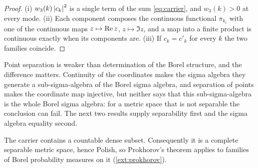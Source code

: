 \begin{proof}
(i) $w_3(k)\left| c_k \right|^2$ is a single term of the sum \eqref{eq:carrier}, and
$w_3(k)>0$ at every mode. (ii) Each component composes the continuous
functional $\pi_{k_i}$ with one of the continuous maps $z\mapsto\operatorname{Re} z$,
$z\mapsto\Im z$, and a map into a finite product is continuous exactly when its
components are. (iii) If $c_k=c'_k$ for every $k$ the two families coincide.
\end{proof}

Point separation is weaker than determination of the Borel structure, and the
difference matters. Continuity of the coordinates makes the sigma algebra they
generate a sub-sigma-algebra of the Borel sigma algebra, and separation of points
makes the coordinate map injective, but neither says that this
sub-sigma-algebra is the whole Borel sigma algebra: for a metric space that is
not separable the conclusion can fail. The next two results supply separability
first and the sigma algebra equality second.

\begin{theorem}[Separability]\label{thm:separable}
The carrier contains a countable dense subset. Consequently it is a complete
separable metric space, hence Polish, so Prokhorov's theorem applies to families
of Borel probability measures on it (\cref{ext:prokhorov}).
\end{theorem}

